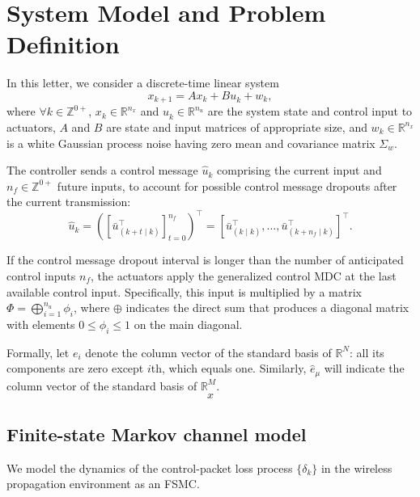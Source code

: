 \documentclass[journal,twoside,web]{ieeecolor}
\begin{document}
\section{System Model and Problem Definition}\label{sec:model}
In this letter, we consider a discrete-time linear system %
\begin{equation}\label{eq:state}
        x_{k+1} = A x_{k} + B u_{k}^{} + w_{k},
\end{equation}
where $\forall k \!\in\! \mathbb{Z}^{0+}$, $x_k\!\in\!\mathbb{R}^{n_x}$ and $u_k^{}\!\in\!\mathbb{R}^{n_u}$ are the system state and control input to actuators, $A$ and $B$ are state and input matrices of appropriate size, and $w_k\!\in\!\mathbb{R}^{n_x}$ is a white Gaussian process noise having zero mean and covariance matrix $\Sigma_w$.

The controller sends a control message $\hat{u}_k$ comprising the current input and $n_{f}\in\mathbb{Z}^{0+}$ future inputs, to account for possible control message dropouts after the current transmission: 
\begin{equation}\label{eq:control-message}
    \hat{u}_k =
    \left(\left[\bar{u}_{(k+t\mid k)}^{\top}\right]_{t=0}^{n_f}\right)^{\top} = 
    \left[\bar{u}_{(k\mid k)}^{\top},\dots,\bar{u}_{(k+n_f\mid k)}^{\top}\right]^{\top}.
\end{equation}

If the control message dropout interval is longer than the number of anticipated control inputs $n_f$, the actuators apply the generalized control MDC at the last available control input.  Specifically, this input is multiplied by a matrix $\mathit{\Phi}=\bigoplus_{i=1}^{n_u} \phi_i$, where $\oplus$ indicates the direct sum that produces a diagonal matrix with elements $0 \leq \phi_i \leq 1$ on the main diagonal.

Formally, let $e_i$ denote the column vector of the standard basis of $\mathbb{R}^{N}$: all its components are zero except $i$th, which equals one. Similarly, $\hat{e}_{\mu}$ will indicate the column vector of the standard basis of $\mathbb{R}^{M}$.
\begin{equation}\label{eq:}
    x
\end{equation}

\subsection{Finite-state Markov channel model}\label{subsec:fsmc}
We model the dynamics of the control-packet loss process $\{\delta_k\}$ in the wireless propagation environment as an FSMC. 
\end{document}
